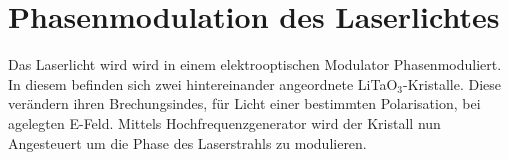
\section{Phasenmodulation des Laserlichtes}

Das Laserlicht wird wird in einem elektrooptischen Modulator Phasenmoduliert. In diesem befinden sich zwei hintereinander angeordnete LiTaO$_3$-Kristalle. Diese verändern ihren Brechungsindes, für Licht einer bestimmten Polarisation, bei agelegten E-Feld. Mittels Hochfrequenzgenerator wird der Kristall nun Angesteuert um die Phase des Laserstrahls zu modulieren.